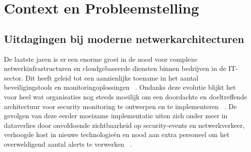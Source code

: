 




\section{Context en Probleemstelling}
\subsection{Uitdagingen bij moderne netwerkarchitecturen}
De laatste jaren is er een enorme groei in de nood voor complexe netwerkinfrastructuren en cloudgebaseerde diensten binnen bedrijven in de IT-sector. Dit heeft geleid tot een aanzienlijke toename in het aantal beveiligingstools en monitoringoplossingen ~\autocite{PersistenceITInfra2025}. Ondanks deze evolutie blijkt het voor heel wat organisaties nog steeds moeilijk om een doordachte en doeltreffende architectuur voor security monitoring te ontwerpen en te implementeren ~\autocite{Obregon_2015}. De gevolgen van deze eerder moeizame implementatie uiten zich onder meer in dataverlies door onvoldoende zichtbaarheid op security-events en netwerkverkeer, verhoogde kost in nieuwe technologieën en nood aan extra personeel om het overweldigend aantal alerts te verwerken ~\autocite{Obregon_2015}. 

